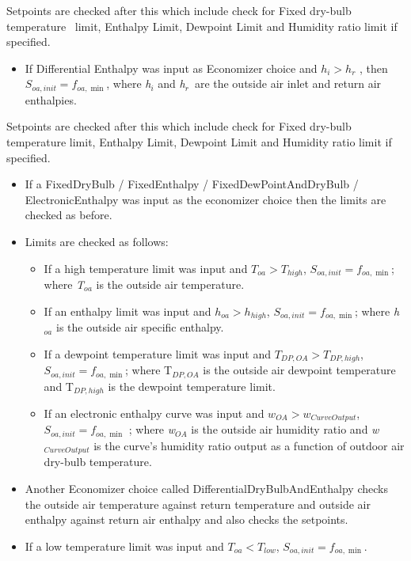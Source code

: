 Setpoints are checked after this which include check for Fixed dry-bulb temperature~ limit, Enthalpy Limit, Dewpoint Limit and Humidity ratio limit if specified.

\begin{itemize}
\item If Differential Enthalpy was input as Economizer choice and \({h_i} > {h_r}\) , then \({S_{oa,init}} = {f_{oa,\min }}\), where \emph{h\(_{i}\)} and \emph{h\(_{r}\)}~are the outside air inlet and return air enthalpies.
\end{itemize}

Setpoints are checked after this which include check for Fixed dry-bulb temperature limit, Enthalpy Limit, Dewpoint Limit and Humidity ratio limit if specified.

\begin{itemize}
\item If a FixedDryBulb / FixedEnthalpy / FixedDewPointAndDryBulb / ElectronicEnthalpy was input as the economizer choice then the limits are checked as before.
\item Limits are checked as follows:
\begin{itemize}
\item If a high temperature limit was input and \({T_{oa}} > {T_{high}}\), \({S_{oa,init}} = {f_{oa,\min }}\); where \emph{T\(_{oa}\)} is the outside air temperature.
\item If an enthalpy limit was input and \({h_{oa}} > {h_{high}}\), \({S_{oa,init}} = {f_{oa,\min }}\); where \emph{h\(_{oa}\)} is the outside air specific enthalpy.
\item If a dewpoint temperature limit was input and \({T_{DP,OA}} > {T_{DP,high}}\), \({S_{oa,init}} = {f_{oa,\min }}\); where T\(_{DP,OA}\) is the outside air dewpoint temperature and T\(_{DP,high}\) is the dewpoint temperature limit.
\item If an electronic enthalpy curve was input and \({w_{OA}} > {w_{CurveOutput}}\), \({S_{oa,init}} = {f_{oa,\min }}\) ; where \emph{w}\(_{OA}\) is the outside air humidity ratio and \emph{w}\(_{CurveOutput}\) is the curve's humidity ratio output as a function of outdoor air dry-bulb temperature.
\end{itemize}
\item Another Economizer choice called DifferentialDryBulbAndEnthalpy checks the outside air temperature against return temperature and outside air enthalpy against return air enthalpy and also checks the setpoints.
\item If a low temperature limit was input and \({T_{oa}} < {T_{low}}\), \({S_{oa,init}} = {f_{oa,\min }}\).
\end{itemize}

